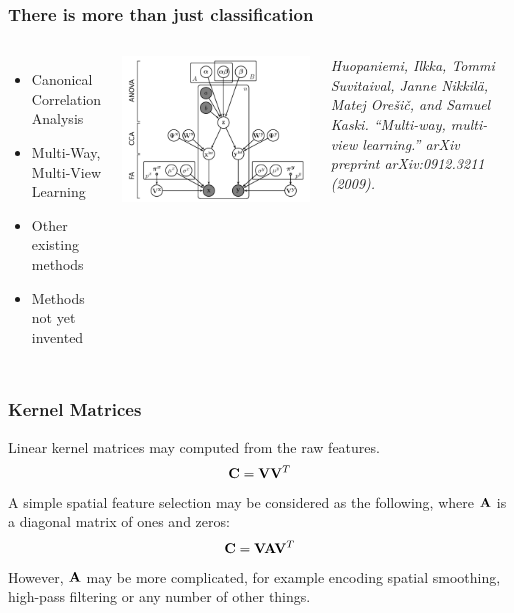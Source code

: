 \begin{frame}
\frametitle{There is more than just classification}
\begin{columns}[c]
\begin{itemize}
\item Canonical Correlation Analysis
\item Multi-Way, Multi-View Learning
\item Other existing methods
\item Methods not yet invented
\end{itemize}
\includegraphics[width=\textwidth]{huopaniemi}

{\itshape\tiny Huopaniemi, Ilkka, Tommi Suvitaival, Janne Nikkil\"{a}, Matej Ore\v{s}i\v{c}, and Samuel Kaski. ``Multi-way, multi-view learning.'' arXiv preprint arXiv:0912.3211 (2009).\par}
\end{columns}
\end{frame}


\begin{frame}
\frametitle{Kernel Matrices}
Linear kernel matrices may computed from the raw features.
\begin{eqnarray*}
{\bf C} = {\bf V}{\bf V}^T
\end{eqnarray*}
A simple spatial feature selection may be considered as the following, where ${\bf A}$ is a diagonal matrix of ones and zeros:
\begin{eqnarray*}
{\bf C} = {\bf V}{\bf A}{\bf V}^T
\end{eqnarray*}
However, ${\bf A}$ may be more complicated, for example encoding spatial smoothing, high-pass filtering or any number of other things.
\end{frame}

